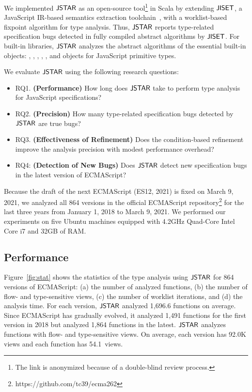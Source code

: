 We implemented $\tool$ as an open-source tool\footnote{The link is anonymized
because of a double-blind review process.} in Scala by extending $\jiset$, a
JavaScript IR-based semantics extraction toolchain~\cite{jiset}, with a worklist-based
fixpoint algorithm for type analysis. Thus, $\tool$ reports type-related specification bugs
detected in fully compiled abstract algorithms by $\jiset$.  For built-in libraries,
$\tool$ analyzes the abstract algorithms of the essential built-in objects: ,
, , , , and objects
for JavaScript primitive types.

We evaluate $\tool$ using the following research questions:
\begin{itemize}
  \item RQ1. \textbf{(Performance)} How long does $\tool$ take to perform type
    analysis for JavaScript specifications?
  \item RQ2. \textbf{(Precision)} How many type-related specification bugs
    detected by $\tool$ are true bugs?
  \item RQ3. \textbf{(Effectiveness of Refinement)} Does the condition-based refinement
    improve the analysis precision with modest performance overhead?
  \item RQ4: \textbf{(Detection of New Bugs)} Does $\tool$ detect new
    specification bugs in the latest version of ECMAScript?
\end{itemize}
Because the draft of the next ECMAScript (ES12, 2021) is fixed on March 9,
2021, we analyzed all 864 versions in the official
ECMAScript repository\footnote{https://github.com/tc39/ecma262} for the last
three years from January 1, 2018 to March 9, 2021.  We performed our experiments
on five Ubuntu machines equipped with 4.2GHz Quad-Core Intel Core i7 and 32GB of
RAM.


\subsection{Performance}\label{sec:performance}

Figure~\ref{fig:stat} shows the statistics of the type analysis using $\tool$ for
864 versions of ECMAScript: (a) the number of analyzed functions, (b) the number
of flow- and type-sensitive views, (c) the number of worklist iterations, and
(d) the analysis time.  For each version, $\tool$ analyzed
1,696.6 functions on average.  Since ECMAScript has gradually evolved,
it analyzed 1,491 functions for the first version in 2018
but analyzed 1,864 functions in the latest.
$\tool$ analyzes functions with flow- and type-sensitive views.
On average, each version has 92.0K views and each function has
54.1~views.

